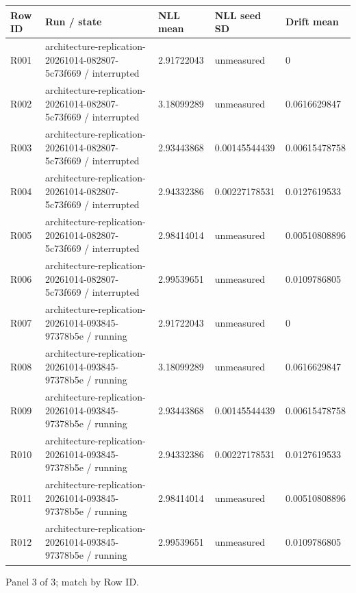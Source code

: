 \documentclass[10pt]{article}
\begin{document}
{\scriptsize\setlength{\tabcolsep}{2pt}
\begin{longtable}{p{}p{}p{}p{}p{}}
Row ID & Run / state & NLL mean & NLL seed SD & Drift mean \\
\hline\endhead
R001 & architecture-replication-20261014-082807-5c73f669 / interrupted & 2.91722043 & unmeasured & 0 \\
R002 & architecture-replication-20261014-082807-5c73f669 / interrupted & 3.18099289 & unmeasured & 0.0616629847 \\
R003 & architecture-replication-20261014-082807-5c73f669 / interrupted & 2.93443868 & 0.00145544439 & 0.00615478758 \\
R004 & architecture-replication-20261014-082807-5c73f669 / interrupted & 2.94332386 & 0.00227178531 & 0.0127619533 \\
R005 & architecture-replication-20261014-082807-5c73f669 / interrupted & 2.98414014 & unmeasured & 0.00510808896 \\
R006 & architecture-replication-20261014-082807-5c73f669 / interrupted & 2.99539651 & unmeasured & 0.0109786805 \\
R007 & architecture-replication-20261014-093845-97378b5e / running & 2.91722043 & unmeasured & 0 \\
R008 & architecture-replication-20261014-093845-97378b5e / running & 3.18099289 & unmeasured & 0.0616629847 \\
R009 & architecture-replication-20261014-093845-97378b5e / running & 2.93443868 & 0.00145544439 & 0.00615478758 \\
R010 & architecture-replication-20261014-093845-97378b5e / running & 2.94332386 & 0.00227178531 & 0.0127619533 \\
R011 & architecture-replication-20261014-093845-97378b5e / running & 2.98414014 & unmeasured & 0.00510808896 \\
R012 & architecture-replication-20261014-093845-97378b5e / running & 2.99539651 & unmeasured & 0.0109786805 \\
\end{longtable}}
\par\noindent Panel 3 of 3; match by Row ID.
\end{document}
